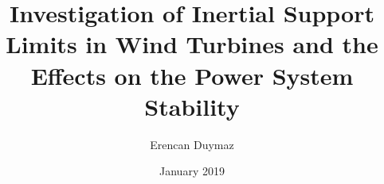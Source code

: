 \documentclass[chaparabic,ee,ms,12pt,oneandhalf]{metu}
\author{Erencan Duymaz}
\title{Investigation of Inertial Support Limits in Wind Turbines and the Effects on the Power System Stability}
\date{January 2019}
\begin{document}
\begin{preliminaries}



\end{preliminaries}
%   
% 
%

\setlength{\parindent}{0em}
\setlength{\parskip}{10pt}











%
%

%

\appendices
%

\end{document}
